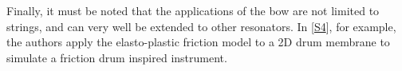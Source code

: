 Finally, it must be noted that the applications of the bow are not limited to strings, and can very well be extended to other resonators. In [\hyperref[ch:listOfPublications]{S4}], for example, the authors apply the elasto-plastic friction model to a 2D drum membrane to simulate a friction drum inspired instrument.